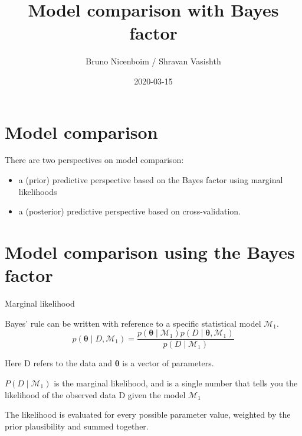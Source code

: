 \documentclass[12pt,ignorenonframetext,aspectratio=169]{beamer}
\title{Model comparison with Bayes factor}
\author{Bruno Nicenboim / Shravan Vasishth}
\date{2020-03-15}
\providecommand{\tightlist}{%
  \setlength{\itemsep}{0pt}\setlength{\parskip}{0pt}}
\begin{document}
\frame{\titlepage}

\begin{frame}
\tableofcontents[hideallsubsections]
\end{frame}
\hypertarget{model-comparison}{%
\section{Model comparison}\label{model-comparison}}

\begin{frame}

There are two perspectives on model comparison:

\begin{itemize}
\tightlist
\item
  a (prior) predictive perspective based on the Bayes factor using marginal likelihoods
\item
  a (posterior) predictive perspective based on cross-validation.
\end{itemize}

\end{frame}

\hypertarget{model-comparison-using-the-bayes-factor}{%
\section{Model comparison using the Bayes factor}\label{model-comparison-using-the-bayes-factor}}

\begin{frame}{Marginal likelihood}
\protect\hypertarget{marginal-likelihood}{}

Bayes' rule can be written with reference to a specific statistical model \(\mathcal{M}_1\).
\begin{equation}
p(\boldsymbol{\theta} \mid D, \mathcal{M}_1) = \frac{p(\boldsymbol{\theta} \mid \mathcal{M}_1) p(D\mid \boldsymbol{\theta}, \mathcal{M}_1) }{p(D\mid \mathcal{M}_1)}
\end{equation}

Here D refers to the data and \(\boldsymbol{\theta}\) is a vector of parameters.

\(P(D\mid \mathcal{M}_1)\) is the marginal likelihood, and is a single number that tells you the likelihood of the observed data D given the model \(\mathcal{M}_1\)

The likelihood is evaluated for every possible parameter value, weighted by the prior plausibility and summed together.

\end{frame}
\end{document}
